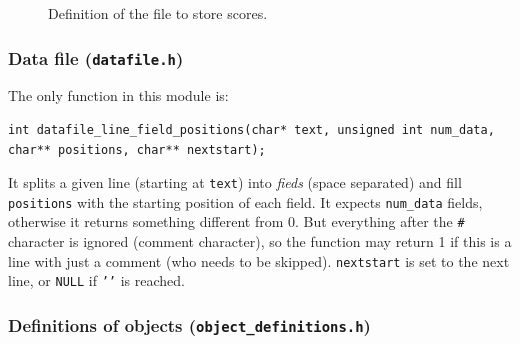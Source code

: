 \documentclass[12pt,a4paper]{article}
\newcommand{\cc}[1]{\texttt{#1}}
\begin{document}
\begin{figure}[!p]
	\centering
{}
\caption{Definition of the file to store scores.}
\label{fig:def:scores}
\end{figure} 

\subsubsection{Data file (\texttt{datafile.h})}

The only function in this module is:\begin{verbatim}
int datafile_line_field_positions(char* text, unsigned int num_data, char** positions, char** nextstart);
\end{verbatim}

It splits a given line (starting at \cc{text}) into \textit{fieds} (space separated) and fill \cc{positions} with the starting position of each field. It expects \cc{num_data} fields, otherwise it returns something different from 0. But everything after the \texttt{\#} character is ignored (comment character), so the function may return 1 if this is a line with just a comment (who needs to be skipped). \cc{nextstart} is set to the next line, or \cc{NULL} if \cc{'\0'} is reached.

\subsubsection{Definitions of objects (\texttt{object\_definitions.h})}
\end{document}

